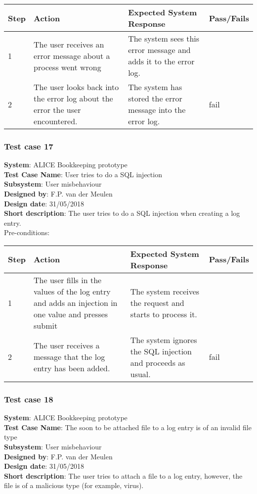 \begin{longtable}{ | p{0.8cm} | p{4.5cm} | p{6cm} | p{1.5cm} |}
\hline
Step & Action & Expected System Response & Pass/Fails  \\ \hline
1 & The user receives an error message about a process went wrong & The system sees this error message and adds it to the error log. &  \\ \hline
2 & The user looks back into the error log about the error the user encountered. & The system has stored the error message into the error log. & fail\\ \hline
 
\end{longtable}

\subsubsection{Test case 17}
\textbf{System}:  ALICE Bookkeeping prototype \\
\textbf{Test Case Name}:  User tries to do a SQL injection  \\
\textbf{Subsystem}:  User misbehaviour \\
\textbf{Designed by}:  F.P. van der Meulen\\
\textbf{Design date}:  31/05/2018\\
\textbf{Short description}: The user tries to do a SQL injection when creating a log entry. \\

Pre-conditions: \\

\begin{longtable}{ | p{0.8cm} | p{4.5cm} | p{6cm} | p{1.5cm} |}
\hline
Step & Action & Expected System Response & Pass/Fails  \\ \hline
1 & The user fills in the values of the log entry and adds an injection in one value and presses submit & The system receives the request and starts to process it. &  \\ \hline
2 & The user receives a message that the log entry has been added. & The system ignores the SQL injection and proceeds as usual. & fail\\ \hline
 
\end{longtable}

\subsubsection{Test case 18}
\textbf{System}:  ALICE Bookkeeping prototype \\
\textbf{Test Case Name}:  The soon to be attached file to a log entry is of an invalid file type  \\
\textbf{Subsystem}:  User misbehaviour \\
\textbf{Designed by}:  F.P. van der Meulen\\
\textbf{Design date}:  31/05/2018\\
\textbf{Short description}: The user tries to attach a file to a log entry, however, the file is of a malicious type (for example, virus). \\

